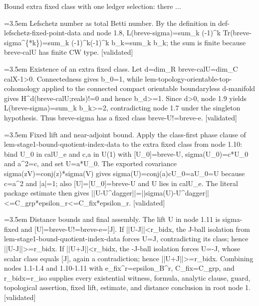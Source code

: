 \documentclass{article}
\newcommand{\step}[1]{\par\noindent\hangindent=3.5em\hangafter=1%
  \makebox[3.5em][l]{\textbf{#1.}}}
\newcommand{\steptag}[1]{\hfill{\small\textsf{[#1]}}}
\begin{document}
\begin{proofbox}{Bound extra fixed class with one ledger selection: there ...}
\step{1.9} Lefschetz number as total Betti number. By the definition in def-lefschetz-fixed-point-data and node 1.8, L(breve-sigma)=sum\_k (-1)\textasciicircum{}k Tr(breve-sigma\textasciicircum{}\{*k\})=sum\_k (-1)\textasciicircum{}k(-1)\textasciicircum{}k b\_k=sum\_k b\_k; the sum is finite because breve-calU has finite CW type. \steptag{validated} \\[4pt]
\step{1.10} Existence of an extra fixed class. Let d=dim\_R breve-calU=dim\_C calX-1>0. Connectedness gives b\_0=1, while lem-topology-orientable-top-cohomology applied to the connected compact orientable boundaryless d-manifold gives H\textasciicircum{}d(breve-calU;reals)!=0 and hence b\_d>=1. Since d>0, node 1.9 yields L(breve-sigma)=sum\_k b\_k>=2, contradicting node 1.7 under the singleton hypothesis. Thus breve-sigma has a fixed class breve-U!=breve-e. \steptag{validated} \\[4pt]
\step{1.11} Fixed lift and near-adjoint bound. Apply the class-first phase clause of lem-stage1-bound-quotient-index-data to the extra fixed class from node 1.10: bind U\_0 in calU\_e and c,a in U(1) with [U\_0]=breve-U, sigma(U\_0)=c*U\_0 and a\textasciicircum{}2=c, and set U=a*U\_0. The exported covariance sigma(zV)=conj(z)*sigma(V) gives sigma(U)=conj(a)cU\_0=aU\_0=U because c=a\textasciicircum{}2 and |a|=1; also [U]=[U\_0]=breve-U and U lies in calU\_e. The literal package estimate then gives ||U-U\textasciicircum{}dagger||=||sigma(U)-U\textasciicircum{}dagger||<=C\_grp*epsilon\_r<=C\_fix*epsilon\_r. \steptag{validated} \\[4pt]
\step{1.12} Distance bounds and final assembly. The lift U in node 1.11 is sigma-fixed and [U]=breve-U!=breve-e=[J]. If ||U-J||<r\_bidx, the J-ball isolation from lem-stage1-bound-quotient-index-data forces U=J, contradicting its class; hence ||U-J||>=r\_bidx. If ||U+J||<r\_bidx, the -J-ball isolation forces U=-J, whose scalar class equals [J], again a contradiction; hence ||U+J||>=r\_bidx. Combining nodes 1.1-1.4 and 1.10-1.11 with e\_fix\textasciicircum{}r=epsilon\_B\textasciicircum{}r, C\_fix=C\_grp, and r\_bidx=r\_iso supplies every existential witness, formula, analytic clause, guard, topological assertion, fixed lift, estimate, and distance conclusion in root node 1. \steptag{validated} \\[4pt]
\end{proofbox}
\end{document}
